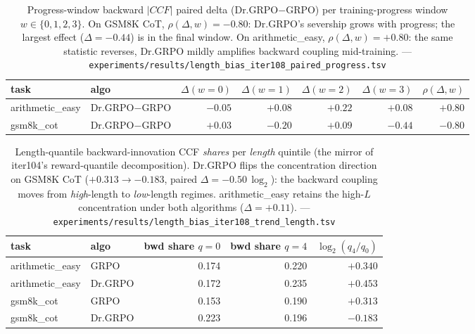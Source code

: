 \begin{table}[t]
\centering
\small
\setlength{\tabcolsep}{5pt}
\begin{tabular}{l l r r r r r}
\hline
task & algo & $\Delta(w{=}0)$ & $\Delta(w{=}1)$ & $\Delta(w{=}2)$ &
$\Delta(w{=}3)$ & $\rho(\Delta,w)$ \\
\hline
arithmetic\_easy & Dr.GRPO$-$GRPO & $-0.05$ & $+0.08$ & $+0.22$ & $+0.08$ & $+0.80$ \\
gsm8k\_cot       & Dr.GRPO$-$GRPO & $+0.03$ & $-0.20$ & $+0.09$ & $-0.44$ & $-0.80$ \\
\hline
\end{tabular}
\caption{Progress-window backward $|CCF|$ paired delta (Dr.GRPO$-$GRPO)
per training-progress window $w\in\{0,1,2,3\}$.
On GSM8K CoT, $\rho(\Delta,w)=-0.80$: Dr.GRPO's severship grows with
progress; the largest effect ($\Delta=-0.44$) is in the final window.
On arithmetic\_easy, $\rho(\Delta,w)=+0.80$: the same statistic reverses,
Dr.GRPO mildly amplifies backward coupling mid-training.
--- \texttt{experiments/results/length\_bias\_iter108\_paired\_progress.tsv}}
\label{tab:length-bias-iter108-progress}
\end{table}

\begin{table}[t]
\centering
\small
\setlength{\tabcolsep}{5pt}
\begin{tabular}{l l r r r}
\hline
task & algo & bwd share $q{=}0$ & bwd share $q{=}4$ &
$\log_2(q_4/q_0)$ \\
\hline
arithmetic\_easy & GRPO     & 0.174 & 0.220 & $+0.340$ \\
arithmetic\_easy & Dr.GRPO  & 0.172 & 0.235 & $+0.453$ \\
\hline
gsm8k\_cot       & GRPO     & 0.153 & 0.190 & $+0.313$ \\
gsm8k\_cot       & Dr.GRPO  & 0.223 & 0.196 & $-0.183$ \\
\hline
\end{tabular}
\caption{Length-quantile backward-innovation CCF \emph{shares} per
\emph{length} quintile (the mirror of iter104's reward-quantile
decomposition).  Dr.GRPO flips the concentration direction on GSM8K
CoT ($+0.313 \to -0.183$, paired $\Delta = -0.50\,\log_2$): the
backward coupling moves from \emph{high}-length to \emph{low}-length
regimes.  arithmetic\_easy retains the high-$L$ concentration under
both algorithms ($\Delta=+0.11$). --- \texttt{experiments/results/length\_bias\_iter108\_trend\_length.tsv}}
\label{tab:length-bias-iter108-lquant}
\end{table}

